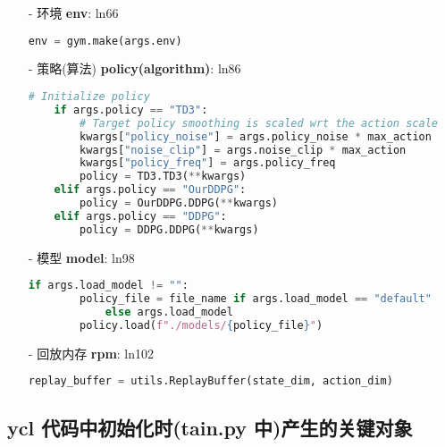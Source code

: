 \begin{itemize}
\item[-]
环境 {\bf env}: ln66
\begin{lstlisting}[language=Python]
	env = gym.make(args.env)
\end{lstlisting}

\item[-]
策略(算法) {\bf policy(algorithm)}: ln86
\begin{lstlisting}[language=Python]
	# Initialize policy
	if args.policy == "TD3":
		# Target policy smoothing is scaled wrt the action scale
		kwargs["policy_noise"] = args.policy_noise * max_action
		kwargs["noise_clip"] = args.noise_clip * max_action
		kwargs["policy_freq"] = args.policy_freq
		policy = TD3.TD3(**kwargs)
	elif args.policy == "OurDDPG":
		policy = OurDDPG.DDPG(**kwargs)
	elif args.policy == "DDPG":
		policy = DDPG.DDPG(**kwargs)
\end{lstlisting}

\item[-]
模型 {\bf model}: ln98
\begin{lstlisting}[language=Python]
	if args.load_model != "":
		policy_file = file_name if args.load_model == "default" 
            else args.load_model
		policy.load(f"./models/{policy_file}")
\end{lstlisting}

\item[-]
回放内存 {\bf rpm}: ln102
\begin{lstlisting}[language=Python]
	replay_buffer = utils.ReplayBuffer(state_dim, action_dim)
\end{lstlisting}
\end{itemize}


\subsection{ycl 代码中初始化时(tain.py 中)产生的关键对象}


